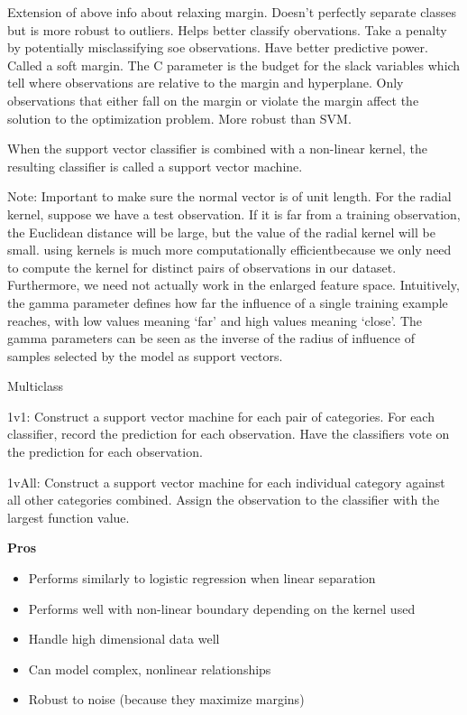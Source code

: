 \documentclass[]{book}
\begin{document}
Extension of above info about relaxing margin. Doesn't perfectly separate classes but is more robust to outliers. Helps better classify obervations. Take a penalty by potentially misclassifying soe observations. Have better predictive power. Called a soft margin. The C parameter is the budget for the slack variables which tell where observations are relative to the margin and hyperplane. Only observations that either fall on the margin or violate the margin affect the solution to the optimization problem. More robust than SVM.

When the support vector classifier is combined with a non-linear kernel, the resulting classifier is called a support vector machine.

Note: Important to make sure the normal vector is of unit length. For the radial kernel, suppose we have a test observation. If it is far from a training observation, the Euclidean distance will be large, but the value of the radial kernel will be small. using kernels is much more computationally efficientbecause we only need to compute the kernel for distinct pairs of observations in our dataset. Furthermore, we need not actually work in the enlarged feature space. Intuitively, the gamma parameter defines how far the influence of a single training example reaches, with low values meaning `far' and high values meaning `close'. The gamma parameters can be seen as the inverse of the radius of influence of samples selected by the model as support vectors.

Multiclass

1v1: Construct a support vector machine for each pair of categories. For each classifier, record the prediction for each observation. Have the classifiers vote on the prediction for each observation.

1vAll: Construct a support vector machine for each individual category against all other categories combined. Assign the observation to the classifier with the largest function value.

\textbf{Pros}

\begin{itemize}
\item
  Performs similarly to logistic regression when linear separation
\item
  Performs well with non-linear boundary depending on the kernel used
\item
  Handle high dimensional data well
\item
  Can model complex, nonlinear relationships
\item
  Robust to noise (because they maximize margins)
\end{itemize}
\end{document}

